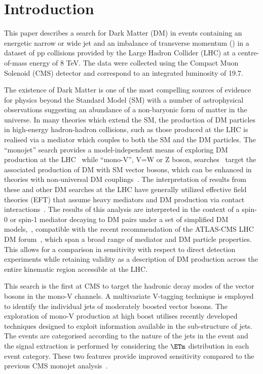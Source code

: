 \section{Introduction}
This paper describes a search for Dark Matter (DM) in events containing an energetic narrow or wide jet and an imbalance of transverse momentum (\ETm) in a dataset 
of pp collisions provided by the Large Hadron Collider (LHC) at a centre-of-mass energy of 8 TeV. The data were collected using the Compact Muon Solenoid (CMS) 
detector and correspond to an integrated luminosity of 19.7\fbinv. 

The existence of Dark Matter is one of the most compelling sources of evidence for physics beyond the Standard Model (SM) with a number of astrophysical observations 
suggesting an abundance of a non-baryonic form of matter in the universe. In many theories which extend the SM, the production of DM particles in high-energy hadron-hadron 
collisions, such as those produced at the LHC is realised via a mediator which couples to both the SM and the DM particles.  
The ``monojet'' search provides a model-independent means of exploring DM production at the LHC~\cite{monojet1,monojet2} while 
 ``mono-V'', V=W or Z boson, searches~\cite{monolep,Aad:2014vka,Aad:2013oja,ATLAS:2014wra} target the associated production of DM with SM vector bosons, 
which can be enhanced in theories with non-universal DM couplings~\cite{IVDM}.  The interpretation of results from these and other DM searches at 
the LHC have generally utilized effective field theories (EFT) that assume heavy mediators and DM production via contact interactions~\cite{Fox:2011pm}.  
The results of this analysis are interpreted in the context of a spin-0 or spin-1 mediator decaying to DM pairs under a set of simplified DM models,~\cite{simplified1,Buchmueller:2013dya,Buchmueller:2014yoa}, compatible with the recent recommendation of the ATLAS-CMS LHC DM forum~\cite{Abercrombie:2015wmb}, which span a broad range of 
mediator and DM particle properties. This allows for a comparison in sensitivity with respect to direct detection experiments while retaining validity as a description of DM 
production across the entire kinematic region accessible at the LHC. 

This search is the first at CMS to target the hadronic decay modes of the vector bosons in the mono-V channels. A multivariate V-tagging technique is 
employed to identify the individual jets of moderately boosted vector bosons. The exploration of mono-V production at high boost 
utilises recently developed techniques designed to exploit information 
available in the sub-structure of jets. The events are categorised according to the nature of the jets in the event and the signal extraction is performed by 
considering the $\ETm$ distribution in each event category. These two features provide improved sensitivity compared to the previous CMS monojet analysis~\cite{monojet1}. 


